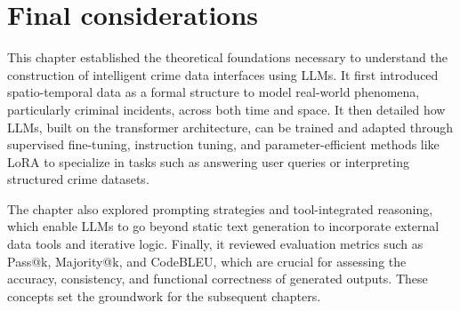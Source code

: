 



\section{Final considerations}

This chapter established the theoretical foundations necessary to understand the construction of intelligent crime data interfaces using LLMs. It first introduced spatio-temporal data as a formal structure to model real-world phenomena, particularly criminal incidents, across both time and space. It then detailed how LLMs, built on the transformer architecture, can be trained and adapted through supervised fine-tuning, instruction tuning, and parameter-efficient methods like LoRA to specialize in tasks such as answering user queries or interpreting structured crime datasets.

The chapter also explored prompting strategies and tool-integrated reasoning, which enable LLMs to go beyond static text generation to incorporate external data tools and iterative logic. Finally, it reviewed evaluation metrics such as Pass@k, Majority@k, and CodeBLEU, which are crucial for assessing the accuracy, consistency, and functional correctness of generated outputs. These concepts set the groundwork for the subsequent chapters.